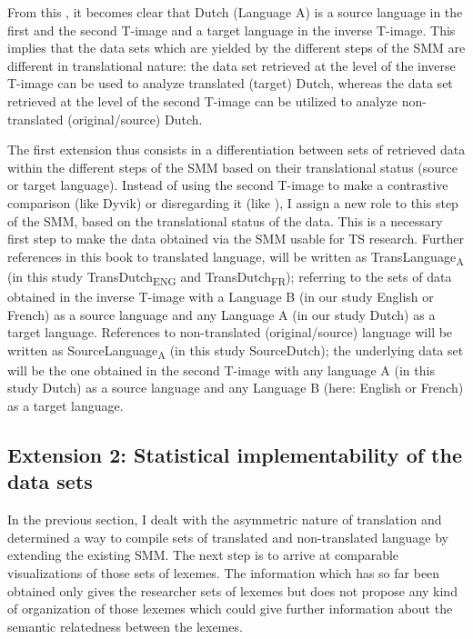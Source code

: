 From this , it becomes clear that Dutch (Language A) is a source language in the first and the second T-image and a target language in the inverse T-image. This implies that the data sets which are yielded by the different steps of the SMM are different in translational nature: the data set retrieved at the level of the inverse T-image can be used to analyze translated (target) Dutch, whereas the data set retrieved at the level of the second T-image can be utilized to analyze non-translated (original/source) Dutch.

The first extension thus consists in a differentiation between sets of retrieved data within the different steps of the SMM based on their translational status (source or target language). Instead of using the second T-image to make a contrastive comparison (like Dyvik) or disregarding it (like \citealt{aijmer_model_2004}), I assign a new role to this step of the SMM, based on the translational status of the data. This is a necessary first step to make the data obtained via the SMM usable for TS research. Further references in this book to translated language, will be written as TransLanguage\textsubscript{A} (in this study TransDutch\textsubscript{ENG} and TransDutch\textsubscript{FR}); referring to the sets of data obtained in the inverse T-image with a Language B (in our study English or French) as a source language and any Language A (in our study Dutch) as a target language. References to non-translated (original/source) language will be written as SourceLanguage\textsubscript{A} (in this study SourceDutch); the underlying data set will be the one obtained in the second T-image with any language A (in this study Dutch) as a source language and any Language B (here: English or French) as a target language.

\subsection{Extension 2: Statistical implementability of the data sets}
\label{sec:3.5.2}
In the previous section, I dealt with the asymmetric nature of translation and determined a way to compile sets of translated and non-translated language by extending the existing SMM. The next step is to arrive at comparable visualizations of those sets of lexemes. The information which has so far been obtained only gives the researcher sets of lexemes but does not propose any kind of organization of those lexemes which could give further information about the semantic relatedness between the lexemes.

